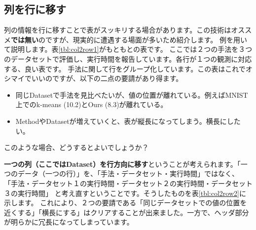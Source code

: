 \documentclass[uplatex,onecolumn,9pt,dvipdfmx]{jsarticle}
\newcommand{\Tref}[1]{表\ref{#1}}
\begin{document}
\subsection{列を行に移す}
列の情報を行に移すことで表がスッキリする場合があります。この技術はオススメ\textbf{では無い}のですが、現実的に遭遇する場面が多いため紹介します。
例を用いて説明します。\Tref{tbl:col2row1}がもともとの表です。
ここでは２つの手法を３つのデータセットで評価し、実行時間を報告しています。各行が１つの観測に対応する、良い表です。
手法に関して行をグループ化しています。この表はこれでオシマイでいいのですが、以下の二点の要請があり得ます。
\begin{itemize}
    \item 同じDatasetで手法を見比べたいが、値の位置が離れている。例えばMNIST上でのk-means (10.2)とOurs (8.3)が離れている。
    \item MethodやDatasetが増えていくと、表が縦長になってしまう。横長にしたい。
\end{itemize}
このような場合、どうするとよいでしょうか？

\textbf{一つの列（ここではDataset）を行方向に移す}ということが考えられます。「一つのデータ（一つの行）」を、「手法・データセット・実行時間」ではなく、
「手法・データセット１の実行時間・データセット２の実行時間・データセット３の実行時間」
と考え直すということです。そうしたものを\Tref{tbl:col2row2}に示します。
これにより、２つの要請である「同じデータセットでの値の位置を近くする」「横長にする」はクリアすることが出来ました。一方で、ヘッダ部分が明らかに冗長になってしまっています。
\end{document}
